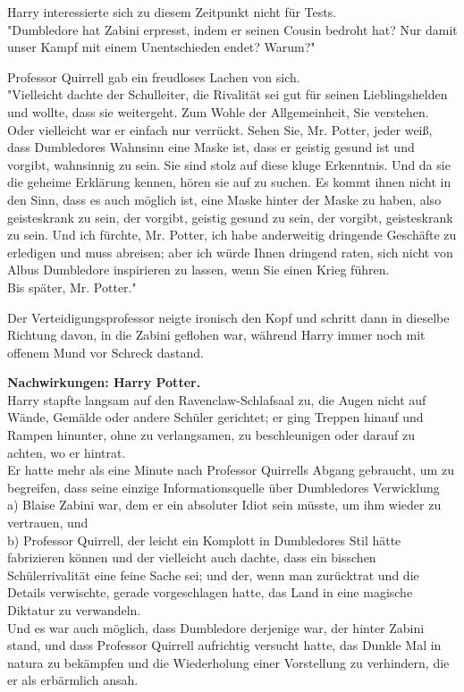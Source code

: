 {Harry interessierte sich zu diesem Zeitpunkt nicht für Tests.\\ "Dumbledore hat Zabini erpresst, indem er seinen Cousin bedroht hat? Nur damit unser Kampf mit einem Unentschieden endet? Warum?"

Professor Quirrell gab ein freudloses Lachen von sich.\\ "Vielleicht dachte der Schulleiter, die Rivalität sei gut für seinen Lieblingshelden und wollte, dass sie weitergeht. Zum Wohle der Allgemeinheit, Sie verstehen. Oder vielleicht war er einfach nur verrückt. Sehen Sie, Mr. Potter, jeder weiß, dass Dumbledores Wahnsinn eine Maske ist, dass er geistig gesund ist und vorgibt, wahnsinnig zu sein. Sie sind stolz auf diese kluge Erkenntnis. Und da sie die geheime Erklärung kennen, hören sie auf zu suchen. Es kommt ihnen nicht in den Sinn, dass es auch möglich ist, eine Maske hinter der Maske zu haben, also geisteskrank zu sein, der vorgibt, geistig gesund zu sein, der vorgibt, geisteskrank zu sein. Und ich fürchte, Mr. Potter, ich habe anderweitig dringende Geschäfte zu erledigen und muss abreisen; aber ich würde Ihnen dringend raten, sich nicht von Albus Dumbledore inspirieren zu lassen, wenn Sie einen Krieg führen.\\ Bis später, Mr. Potter."

Der Verteidigungsprofessor neigte ironisch den Kopf und schritt dann in dieselbe Richtung davon, in die Zabini geflohen war, während Harry immer noch mit offenem Mund vor Schreck dastand.

\textbf{Nachwirkungen: Harry Potter.}\\ Harry stapfte langsam auf den Ravenclaw-Schlafsaal zu, die Augen nicht auf Wände, Gemälde oder andere Schüler gerichtet; er ging Treppen hinauf und Rampen hinunter, ohne zu verlangsamen, zu beschleunigen oder darauf zu achten, wo er hintrat.\\ Er hatte mehr als eine Minute nach Professor Quirrells Abgang gebraucht, um zu begreifen, dass seine einzige Informationsquelle über Dumbledores Verwicklung\\ a) Blaise Zabini war, dem er ein absoluter Idiot sein müsste, um ihm wieder zu vertrauen, und\\ b) Professor Quirrell, der leicht ein Komplott in Dumbledores Stil hätte fabrizieren können und der vielleicht auch dachte, dass ein bisschen Schülerrivalität eine feine Sache sei; und der, wenn man zurücktrat und die Details verwischte, gerade vorgeschlagen hatte, das Land in eine magische Diktatur zu verwandeln.\\ Und es war auch möglich, dass Dumbledore derjenige war, der hinter Zabini stand, und dass Professor Quirrell aufrichtig versucht hatte, das Dunkle Mal in natura zu bekämpfen und die Wiederholung einer Vorstellung zu verhindern, die er als erbärmlich ansah.

}
